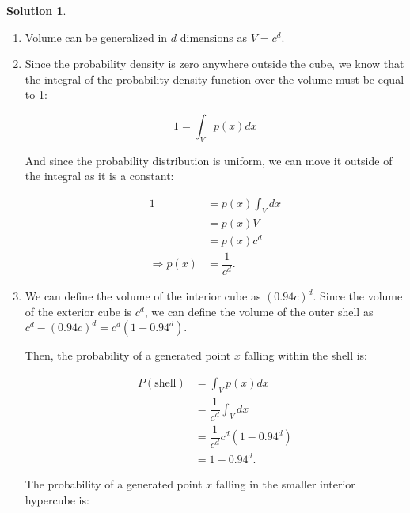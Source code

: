 \documentclass{article}
\theoremstyle{definition}
\newtheorem*{solution}{Solution}
\begin{document}
\begin{solution}\
	\begin{enumerate}[1.]
    	\item Volume can be generalized in $d$ dimensions as $V = c^{d}$.
        
        \item Since the probability density is zero anywhere outside the cube, we know that the integral of the probability density function over the volume must be equal to 1:
        
        \begin{equation*}
            	1 = \int_{V} p(x) dx
        \end{equation*}
        
        And since the probability distribution is uniform, we can move it outside of the integral as it is a constant:
        
        \begin{equation*}
        	\begin{split}
            	1 & = p(x) \int_{V} dx\\
                & = p(x)V\\
                & = p(x)c^{d}\\
                \Rightarrow p(x) & = \dfrac{1}{c^{d}}.
            \end{split}
        \end{equation*}
        
        \item We can define the volume of the interior cube as $(0.94c)^{d}$. Since the volume of the exterior cube is $c^{d}$, we can define the volume of the outer shell as $c^{d} - (0.94c)^{d} = c^{d}(1-0.94^{d})$.
        
        Then, the probability of a generated point $x$ falling within the shell is:
        
        \begin{equation*}
        	\begin{split}
            	P(\text{shell}) & = \int_{V} p(x) dx \\
                & = \dfrac{1}{c^{d}} \int_{V} dx \\
                & = \dfrac{1}{c^{d}} c^{d} (1-0.94^{d}) \\
                & = 1 - 0.94^{d}.
            \end{split}
        \end{equation*}
        
        The probability of a generated point $x$ falling in the smaller interior hypercube is:
        

\end{enumerate}
\end{solution}
\end{document}
